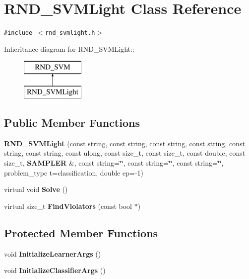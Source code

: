 \section{RND\_\-SVMLight Class Reference}
\label{classRND__SVMLight}
{\tt \#include $<$rnd\_\-svmlight.h$>$}

Inheritance diagram for RND\_\-SVMLight::\begin{figure}[H]
\begin{center}
\leavevmode
\includegraphics[height=2cm]{classRND__SVMLight}
\end{center}
\end{figure}
\subsection*{Public Member Functions}
\begin{CompactItemize}
\item 
\textbf{RND\_\-SVMLight} (const string, const string, const string, const string, const string, const string, const ulong, const size\_\-t, const size\_\-t, const double, const size\_\-t, {\bf SAMPLER} \&, const string=\char`\"{}\char`\"{}, const string=\char`\"{}\char`\"{}, const string=\char`\"{}\char`\"{}, problem\_\-type t=classification, double ep=-1)\label{classRND__SVMLight_8d62ffa851f300c6608fdc83e76afc73}

\item 
virtual void \textbf{Solve} ()\label{classRND__SVMLight_bb7757c0567e7347dcbdc0f0b4763ae9}

\item 
virtual size\_\-t \textbf{FindViolators} (const bool $\ast$)\label{classRND__SVMLight_0c7ecd93afd0b1ff0980ea093a5976d2}

\end{CompactItemize}
\subsection*{Protected Member Functions}
\begin{CompactItemize}
\item 
void \textbf{InitializeLearnerArgs} ()\label{classRND__SVMLight_6aa7547fae38ec032e49ba7ce260aa03}

\item 
void \textbf{InitializeClassifierArgs} ()\label{classRND__SVMLight_37e11768a55658626507249007b74010}

\end{CompactItemize}

